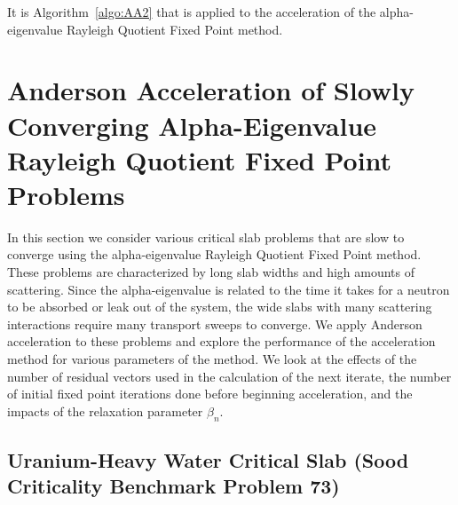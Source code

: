 It is Algorithm~\ref{algo:AA2} that is applied to the acceleration of the alpha-eigenvalue Rayleigh Quotient Fixed Point method.

\section{Anderson Acceleration of Slowly Converging Alpha-Eigenvalue Rayleigh Quotient Fixed Point Problems}

In this section we consider various critical slab problems that are slow to converge using the alpha-eigenvalue Rayleigh Quotient Fixed Point method. These problems are characterized by long slab widths and high amounts of scattering. Since the alpha-eigenvalue is related to the time it takes for a neutron to be absorbed or leak out of the system, the wide slabs with many scattering interactions require many transport sweeps to converge. We apply Anderson acceleration to these problems and explore the performance of the acceleration method for various parameters of the method. We look at the effects of the number of residual vectors used in the calculation of the next iterate, the number of initial fixed point iterations done before beginning acceleration, and the impacts of the relaxation parameter $\beta_{n}$.

\subsection{Uranium-Heavy Water Critical Slab (Sood Criticality Benchmark Problem 73)}

